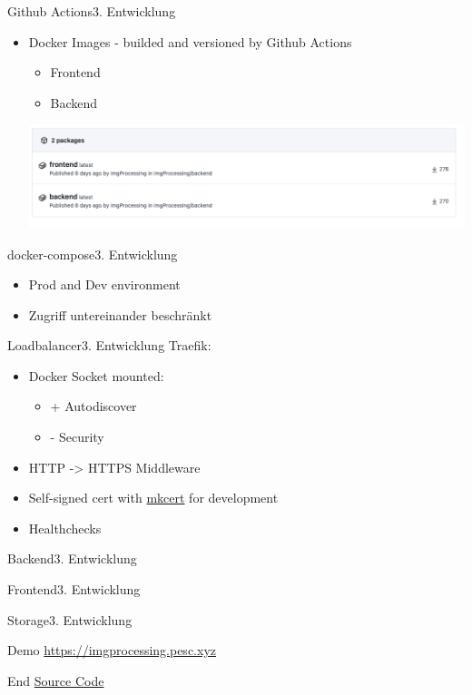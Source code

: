 \documentclass[aspectratio=169,20pt]{beamer}
\begin{document}
\begin{frame}{Github Actions}{3. Entwicklung}
	\begin{itemize}
		\item{Docker Images - builded and versioned by Github Actions}
		\begin{itemize}
			\item{Frontend}
			\item{Backend}
		\end{itemize}
		\includegraphics[scale=0.8]{action}
	\end{itemize}
\end{frame}

\begin{frame}{docker-compose}{3. Entwicklung}
	\begin{itemize}
		\item{Prod and Dev environment}
		\item{Zugriff untereinander beschränkt}
	\end{itemize}
\end{frame}

\begin{frame}{Loadbalancer}{3. Entwicklung}
    Traefik:
	\begin{itemize}
		\item{Docker Socket mounted:}
		\begin{itemize}
			\item{+ Autodiscover}
			\item{- Security}
		\end{itemize}
		\item{HTTP -> HTTPS Middleware}
        \item{Self-signed cert with \href{https://github.com/FiloSottile/mkcert}{mkcert} for development}
        \item{Healthchecks}
	\end{itemize}
\end{frame}

\begin{frame}{Backend}{3. Entwicklung}

\end{frame}

\begin{frame}{Frontend}{3. Entwicklung}

\end{frame}

\begin{frame}{Storage}{3. Entwicklung}

\end{frame}

\begin{frame}{Demo}{}
	\href{https://imgprocessing.pesc.xyz/}{https://imgprocessing.pesc.xyz}
\end{frame}

\begin{frame}{End}{}
	\href{https://github.com/imgProcessing/backend}{Source Code}
\end{frame}
\end{document}
